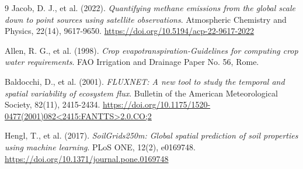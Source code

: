 \documentclass[final,3p,times,twocolumn]{elsarticle}
\begin{document}
\begin{thebibliography}{9}
Jacob, D. J., et al. (2022). \textit{Quantifying methane emissions from the global scale down to point sources using satellite observations}. Atmospheric Chemistry and Physics, 22(14), 9617-9650. \url{https://doi.org/10.5194/acp-22-9617-2022}

Allen, R. G., et al. (1998). \textit{Crop evapotranspiration-Guidelines for computing crop water requirements}. FAO Irrigation and Drainage Paper No. 56, Rome.

Baldocchi, D., et al. (2001). \textit{FLUXNET: A new tool to study the temporal and spatial variability of ecosystem flux}. Bulletin of the American Meteorological Society, 82(11), 2415-2434. \url{https://doi.org/10.1175/1520-0477(2001)082<2415:FANTTS>2.0.CO;2}

Hengl, T., et al. (2017). \textit{SoilGrids250m: Global spatial prediction of soil properties using machine learning}. PLoS ONE, 12(2), e0169748. \url{https://doi.org/10.1371/journal.pone.0169748}

\end{thebibliography}
\end{document}
